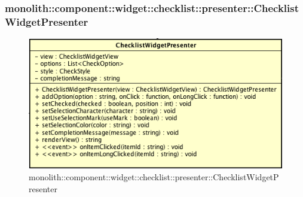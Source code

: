 \subsubsection{monolith::component::widget::checklist::presenter::ChecklistWidgetPresenter}

\label{monolith::component::widget::checklist::presenter::ChecklistWidgetPresenter}
\begin{figure}[ht]
	\centering
	\includegraphics[scale=0.5]{Sezioni/SottosezioniST/img/ChecklistWidgetPresenter.png}
	\caption{monolith::component::widget::checklist::presenter::ChecklistWidgetPresenter}
\end{figure}

